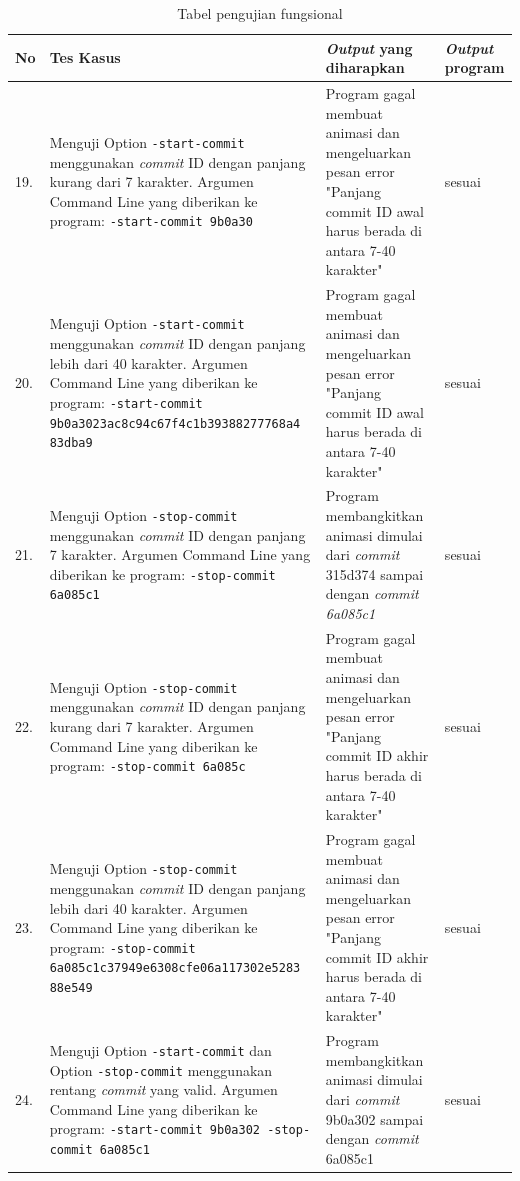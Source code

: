 \begin{table}[htbp]
	\centering
	\caption{Tabel pengujian fungsional}
	
		\begin{tabular}{|p{0.3cm}|>{\raggedright} p{7 cm}| p{5.5 cm}| p{3 cm}|} \hline
		No & Tes Kasus	& \textit{Output} yang diharapkan & \textit{Output} program \\ \hline

19. & Menguji Option \texttt{-start-commit} menggunakan \textit{commit} ID dengan panjang kurang dari 7 karakter. Argumen Command Line yang diberikan ke program: \texttt{-start-commit 9b0a30} & Program gagal membuat animasi dan mengeluarkan pesan error "Panjang commit ID awal harus berada di antara 7-40 karakter" & sesuai  \\ \hline
		20.&  Menguji Option \texttt{-start-commit} menggunakan \textit{commit} ID dengan panjang lebih dari 40 karakter. Argumen Command Line yang diberikan ke program:  \texttt{-start-commit 9b0a3023ac8c94c67f4c1b39388277768a4 83dba9} & Program gagal membuat animasi dan mengeluarkan pesan error "Panjang commit ID awal harus berada di antara 7-40 karakter" & sesuai  \\ \hline
		21. & Menguji Option \texttt{-stop-commit} menggunakan \textit{commit} ID dengan panjang 7 karakter. Argumen Command Line yang diberikan ke program:  \texttt{-stop-commit 6a085c1}  & Program membangkitkan animasi dimulai dari \textit{commit} 315d374 sampai dengan \textit{commit 6a085c1}  & sesuai  \\ \hline
		22. & Menguji Option \texttt{-stop-commit} menggunakan \textit{commit} ID dengan panjang kurang dari 7 karakter. Argumen Command Line yang diberikan ke program: \texttt{-stop-commit 6a085c} & Program gagal membuat animasi dan mengeluarkan pesan error "Panjang commit ID akhir harus berada di antara 7-40 karakter" & sesuai  \\ \hline
		23. & Menguji Option \texttt{-stop-commit} menggunakan \textit{commit} ID dengan panjang lebih dari 40 karakter. Argumen Command Line yang diberikan ke program: \texttt{-stop-commit 6a085c1c37949e6308cfe06a117302e5283 88e549} & Program gagal membuat animasi dan mengeluarkan pesan error "Panjang commit ID akhir harus berada di antara 7-40 karakter"  & sesuai  \\ \hline
		24. & Menguji Option \texttt{-start-commit} dan Option \texttt{-stop-commit} menggunakan rentang \textit{commit} yang valid. Argumen Command Line yang diberikan ke program: \texttt{-start-commit 9b0a302 -stop-commit 6a085c1} & Program membangkitkan animasi dimulai dari \textit{commit} 9b0a302 sampai dengan \textit{commit} 6a085c1 & sesuai  \\ \hline

\end{tabular}
\end{table}
